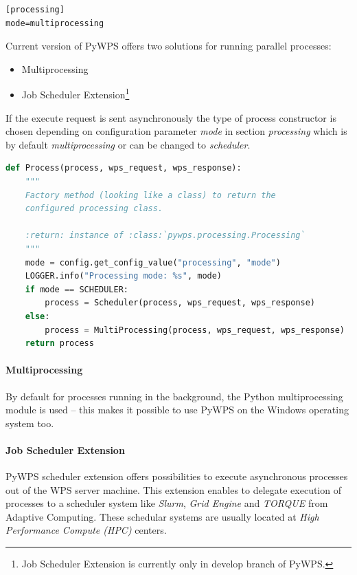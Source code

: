 \documentclass[12pt,a4paper]{article}
\begin{document}
\bigskip
\begin{lstlisting}[basicstyle=\small,caption={pywps.cfg - mode parameter}]
[processing]
mode=multiprocessing
\end{lstlisting}

Current version of PyWPS offers two solutions for running parallel processes:
\begin{itemize}
\item Multiprocessing
\item Job Scheduler Extension\footnote{Job Scheduler Extension is currently only in develop branch of PyWPS.}
\end{itemize}

If the execute request is sent asynchronously the type of process constructor is chosen depending on configuration
parameter \textit{mode} in section \textit{processing} which is by default \textit{multiprocessing} or can be changed 
to \textit{scheduler}.

\bigskip
\begin{lstlisting}[basicstyle=\small,caption={processing.\_\_init\_\_.py},label={lst:Process_init},language=python]
def Process(process, wps_request, wps_response):
    """
    Factory method (looking like a class) to return the
    configured processing class.

    :return: instance of :class:`pywps.processing.Processing`
    """
    mode = config.get_config_value("processing", "mode")
    LOGGER.info("Processing mode: %s", mode)
    if mode == SCHEDULER:
        process = Scheduler(process, wps_request, wps_response)
    else:
        process = MultiProcessing(process, wps_request, wps_response)
    return process
\end{lstlisting}
\bigskip
\bigskip

\paragraph{Multiprocessing}
By default for   processes   running   in   the   background,   the   Python multiprocessing module is used – 
this makes it possible to use PyWPS on the Windows operating system too.

\paragraph{Job Scheduler Extension}
PyWPS scheduler extension offers possibilities to execute asynchronous processes out of the WPS server machine.
This extension enables to delegate execution of processes to a scheduler system like \textit{Slurm}, \textit{Grid Engine} 
and \textit{TORQUE} from Adaptive Computing. These schedular systems are usually located at \textit{High Performance Compute (HPC)}
centers.
\end{document}
